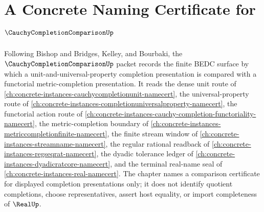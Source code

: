 \chapter{A Concrete Naming Certificate for $\CauchyCompletionComparisonUp$}
\label{ch:concrete-instances-cauchy-completion-comparison-namecert}

Following Bishop and Bridges, Kelley, and Bourbaki, the $\CauchyCompletionComparisonUp$ packet records the finite BEDC surface by which a unit-and-universal-property completion presentation is compared with a functorial metric-completion presentation. It reads the dense unit route of \autoref{ch:concrete-instances-cauchycompletionunit-namecert}, the universal-property route of \autoref{ch:concrete-instances-completionuniversalproperty-namecert}, the functorial action route of \autoref{ch:concrete-instances-cauchy-completion-functoriality-namecert}, the metric-completion boundary of \autoref{ch:concrete-instances-metriccompletionfinite-namecert}, the finite stream window of \autoref{ch:concrete-instances-streamname-namecert}, the regular rational readback of \autoref{ch:concrete-instances-regseqrat-namecert}, the dyadic tolerance ledger of \autoref{ch:concrete-instances-dyadicratcore-namecert}, and the terminal real-name seal of \autoref{ch:concrete-instances-real-namecert}. The chapter names a comparison certificate for displayed completion presentations only; it does not identify quotient completions, choose representatives, assert host equality, or import completeness of $\RealUp$.

